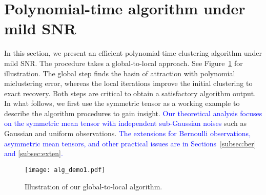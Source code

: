 \documentclass[lettersize,onecolumn,journal]{IEEEtran}
\theoremstyle{definition}
\theoremstyle{definition}
\newtheorem{rmk}{Remark}
\begin{document}



\section{Polynomial-time algorithm under mild SNR}\label{sec:alg}
In this section, we present an efficient polynomial-time clustering algorithm under mild SNR. The procedure takes a global-to-local approach. See Figure~\ref{fig:demo} for illustration. The global step finds the basin of attraction with polynomial miclustering error, whereas the local iterations improve the initial clustering to exact recovery. Both steps are critical to obtain a satisfactory algorithm output. In what follows, we first use the symmetric tensor as a working example to describe the algorithm procedures to gain insight.  \textcolor{blue}{Our theoretical analysis focuses on the symmetric mean tensor with independent sub-Gaussian noises} 
such as Gaussian and uniform observations. \textcolor{blue}{The extensions for Bernoulli observations, asymmetric mean tensors, and other practical issues are in Sections~\ref{subsec:ber} and \ref{subsec:exten}.}

\begin{figure}[ht!]
\centering
\texttt{[image: alg\_demo1.pdf]}
\caption{Illustration of our global-to-local algorithm.}\label{fig:demo}
\end{figure}
\end{document}
